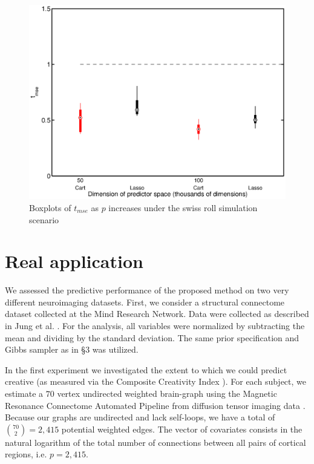 \documentclass{article} %
\begin{document}
\begin{figure}
\centering
\includegraphics[width=1.0\linewidth]{box_exp3.eps} 
\caption{Boxplots of  $t_{mse}$ as $p$ increases under the swiss roll simulation scenario} \label{swiss:plot}
\end{figure}



\section{Real application}

We assessed the predictive performance of the proposed method on two very different neuroimaging datasets. First, we consider a structural connectome dataset collected at the Mind Research Network.  Data were collected as described in Jung et al. \cite{Jung2010}. For the analysis, all variables were normalized by subtracting the mean and dividing by the standard deviation. The same prior specification and Gibbs sampler as in \S 3 was  utilized. 

In the first experiment we investigated the extent to which we could predict creative (as measured via the Composite Creativity Index \cite{Arden2010}).   For each subject, we estimate a $70$ vertex undirected weighted brain-graph using the Magnetic Resonance Connectome Automated Pipeline \cite{MRCAP11} from diffusion tensor imaging data \cite{Mori2006}. Because our graphs are undirected and lack self-loops, we have a total of $\binom{70}{2}=2,415$ potential weighted edges. The vector of covariates consists in the natural logarithm of the total number of connections between all pairs of cortical regions, i.e. $p=2,415$. 
\end{document}
